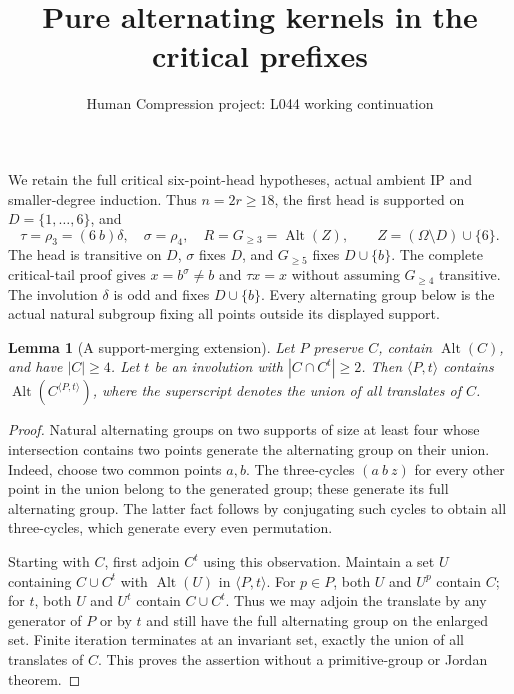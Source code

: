 \documentclass[11pt,a4paper]{article}
\title{Pure alternating kernels in the critical prefixes}
\author{Human Compression project: L044 working continuation}
\date{}
\newtheorem{lemma}{Lemma}
\newcommand{\gen}[1]{\langle#1\rangle}
\newcommand{\Alt}{\operatorname{Alt}}
\begin{document}
\maketitle
We retain the full critical six-point-head hypotheses, actual ambient
IP and smaller-degree induction. Thus $n=2r\ge18$, the first head
is supported on $D=\{1,\ldots,6\}$, and
\[
 \tau=\rho_3=(6\ b)\delta,\quad \sigma=\rho_4,\quad
 R=G_{\ge3}=\Alt(Z),\qquad Z=(\Omega\setminus D)\cup\{6\}.
\]
The head is transitive on $D$, $\sigma$ fixes $D$, and $G_{\ge5}$
fixes $D\cup\{b\}$. The complete critical-tail proof gives
$x=b^\sigma\ne b$ and $\tau x=x$ without assuming $G_{\ge4}$
transitive. The involution $\delta$ is odd and fixes $D\cup\{b\}$.
Every alternating group below is the actual natural subgroup fixing
all points outside its displayed support.

\begin{lemma}[A support-merging extension]\label{merge}
Let $P$ preserve $C$, contain $\Alt(C)$, and have $|C|\ge4$.
Let $t$ be an involution with $|C\cap C^t|\ge2$.
Then $\gen{P,t}$ contains $\Alt(C^{\gen{P,t}})$, where the
superscript denotes the union of all translates of $C$.
\end{lemma}
\begin{proof}
Natural alternating groups on two supports of size at least four
whose intersection contains two points generate the alternating
group on their union. Indeed, choose two common points $a,b$.
The three-cycles $(a\ b\ z)$ for every other point in the union
belong to the generated group; these generate its full alternating
group. The latter fact follows by conjugating such cycles to obtain
all three-cycles, which generate every even permutation.

Starting with $C$, first adjoin $C^t$ using this observation.
Maintain a set $U$ containing $C\cup C^t$ with $\Alt(U)$ in
$\gen{P,t}$. For $p\in P$, both $U$ and $U^p$ contain $C$;
for $t$, both $U$ and $U^t$ contain $C\cup C^t$.
Thus we may adjoin the translate by any generator of $P$ or by
$t$ and still have the full alternating group on the enlarged set.
Finite iteration terminates at an invariant set, exactly the
union of all translates of $C$. This proves the assertion without
a primitive-group or Jordan theorem.
\end{proof}
\end{document}
